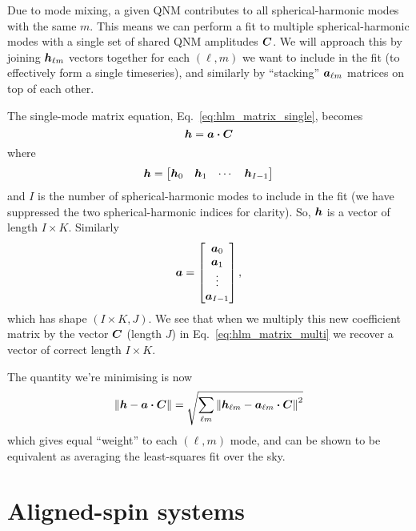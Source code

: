 Due to mode mixing, a given QNM contributes to all spherical-harmonic modes with the same $m$. 
This means we can perform a fit to multiple spherical-harmonic modes with a single set of shared QNM amplitudes $\vb*{C}$.
We will approach this by joining $\vb*{h}_{\ell m}$ vectors together for each $(\ell, m)$ we want to include in the fit (to effectively form a single timeseries), and similarly by ``stacking'' $\vb*{a}_{\ell m}$ matrices on top of each other.

The single-mode matrix equation, Eq.~\ref{eq:hlm_matrix_single}, becomes
\begin{equation}\label{eq:hlm_matrix_multi}
    \vb*{h} = \vb*{a} \vdot \vb*{C}
\end{equation}
where
\begin{equation}
    \vb*{h} = 
    \begin{bmatrix}
    \vb*{h}_0 & \vb*{h}_1 & \cdots & \vb*{h}_{I-1}
    \end{bmatrix}
\end{equation}
and $I$ is the number of spherical-harmonic modes to include in the fit (we have suppressed the two spherical-harmonic indices for clarity). So, $\vb*{h}$ is a vector of length $I \times K$.
Similarly
\begin{equation}
    \vb*{a} = 
    \begin{bmatrix}
    \vb*{a}_0 \\ \vb*{a}_1 \\ \vdots \\ \vb*{a}_{I-1}
    \end{bmatrix},
\end{equation}
which has shape $(I \times K, J)$. 
We see that when we multiply this new coefficient matrix by the vector $\vb*{C}$ (length $J$) in Eq.~\ref{eq:hlm_matrix_multi} we recover a vector of correct length $I \times K$.

The quantity we're minimising is now
\begin{equation}
    \norm{\vb*{h} - \vb*{a} \vdot \vb*{C}} = \sqrt{ \sum_{\ell m} \norm{\vb*{h}_{\ell m} - \vb*{a}_{\ell m} \vdot \vb*{C}}^2 }
\end{equation}
which gives equal ``weight'' to each $(\ell,m)$ mode, and can be shown to be equivalent as averaging the least-squares fit over the sky.

\section{Aligned-spin systems}\label{aligned-spin-section}

